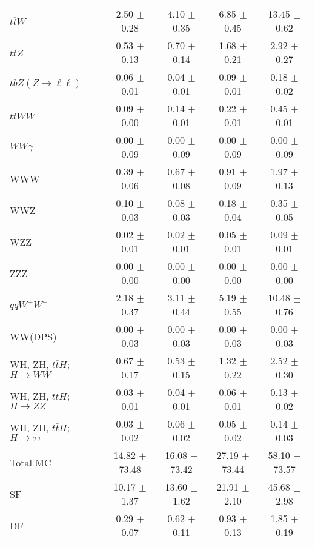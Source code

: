 \begin{tabular}{l|cccc}
                   $t\overline{t}W$ &  2.50 $\pm$  0.28 &  4.10 $\pm$  0.35 &  6.85 $\pm$  0.45 & 13.45 $\pm$  0.62 \\
                   $t\overline{t}Z$ &  0.53 $\pm$  0.13 &  0.70 $\pm$  0.14 &  1.68 $\pm$  0.21 &  2.92 $\pm$  0.27 \\
    $tbZ (Z \rightarrow \ell \ell)$ &  0.06 $\pm$  0.01 &  0.04 $\pm$  0.01 &  0.09 $\pm$  0.01 &  0.18 $\pm$  0.02 \\
                  $t\overline{t}WW$ &  0.09 $\pm$  0.00 &  0.14 $\pm$  0.01 &  0.22 $\pm$  0.01 &  0.45 $\pm$  0.01 \\
                         $WW\gamma$ &  0.00 $\pm$  0.09 &  0.00 $\pm$  0.09 &  0.00 $\pm$  0.09 &  0.00 $\pm$  0.09 \\
                                WWW &  0.39 $\pm$  0.06 &  0.67 $\pm$  0.08 &  0.91 $\pm$  0.09 &  1.97 $\pm$  0.13 \\
                                WWZ &  0.10 $\pm$  0.03 &  0.08 $\pm$  0.03 &  0.18 $\pm$  0.04 &  0.35 $\pm$  0.05 \\
                                WZZ &  0.02 $\pm$  0.01 &  0.02 $\pm$  0.01 &  0.05 $\pm$  0.01 &  0.09 $\pm$  0.01 \\
                                ZZZ &  0.00 $\pm$  0.00 &  0.00 $\pm$  0.00 &  0.00 $\pm$  0.00 &  0.00 $\pm$  0.00 \\
                 $qqW^{\pm}W^{\pm}$ &  2.18 $\pm$  0.37 &  3.11 $\pm$  0.44 &  5.19 $\pm$  0.55 & 10.48 $\pm$  0.76 \\
                            WW(DPS) &  0.00 $\pm$  0.03 &  0.00 $\pm$  0.03 &  0.00 $\pm$  0.03 &  0.00 $\pm$  0.03 \\
WH, ZH, $t\bar{t}H$; $H \rightarrow WW$ &  0.67 $\pm$  0.17 &  0.53 $\pm$  0.15 &  1.32 $\pm$  0.22 &  2.52 $\pm$  0.30 \\
WH, ZH, $t\bar{t}H$; $H \rightarrow ZZ$ &  0.03 $\pm$  0.01 &  0.04 $\pm$  0.01 &  0.06 $\pm$  0.01 &  0.13 $\pm$  0.02 \\
WH, ZH, $t\bar{t}H$; $H \rightarrow \tau\tau$ &  0.03 $\pm$  0.02 &  0.06 $\pm$  0.02 &  0.05 $\pm$  0.02 &  0.14 $\pm$  0.03 \\
\hline\hline
                           Total MC & 14.82 $\pm$ 73.48 & 16.08 $\pm$ 73.42 & 27.19 $\pm$ 73.44 & 58.10 $\pm$ 73.57 \\
\hline
                                 SF & 10.17 $\pm$  1.37 & 13.60 $\pm$  1.62 & 21.91 $\pm$  2.10 & 45.68 $\pm$  2.98 \\
                                 DF &  0.29 $\pm$  0.07 &  0.62 $\pm$  0.11 &  0.93 $\pm$  0.13 &  1.85 $\pm$  0.19 \\

\end{tabular}
